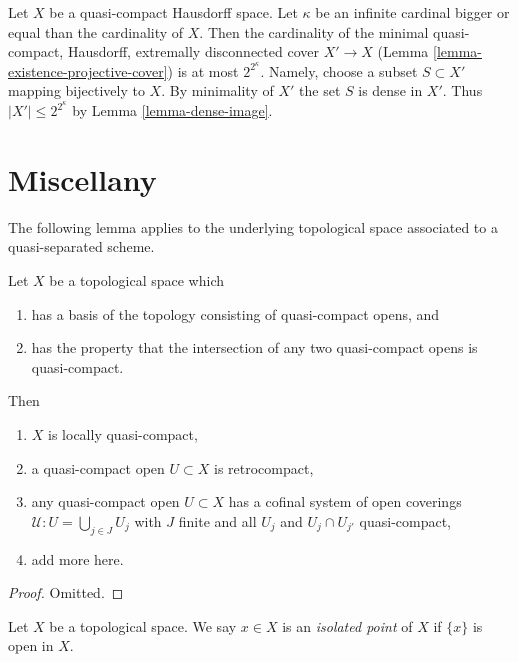 \begin{remark}
\label{remark-size-projective-cover}
Let $X$ be a quasi-compact Hausdorff space. Let $\kappa$ be an infinite
cardinal bigger or equal than the cardinality of $X$. Then the cardinality
of the minimal quasi-compact, Hausdorff, extremally disconnected cover
$X' \to X$ (Lemma \ref{lemma-existence-projective-cover})
is at most $2^{2^\kappa}$. Namely, choose a subset $S \subset X'$
mapping bijectively to $X$. By minimality of $X'$ the set $S$ is dense
in $X'$. Thus $|X'| \leq 2^{2^\kappa}$ by Lemma \ref{lemma-dense-image}.
\end{remark}






\section{Miscellany}
\label{section-miscellany}


\noindent
The following lemma applies to the underlying topological space
associated to a quasi-separated scheme.

\begin{lemma}
\label{lemma-topology-quasi-separated-scheme}
Let $X$ be a topological space which
\begin{enumerate}
\item has a basis of the topology consisting of quasi-compact opens, and
\item has the property that the intersection of any two quasi-compact
opens is quasi-compact.
\end{enumerate}
Then
\begin{enumerate}
\item $X$ is locally quasi-compact,
\item a quasi-compact open $U \subset X$ is retrocompact,
\item any quasi-compact open $U \subset X$ has a cofinal system of open
coverings $\mathcal{U} : U = \bigcup_{j\in J} U_j$ with $J$ finite
and all $U_j$ and $U_j \cap U_{j'}$ quasi-compact,
\item add more here.
\end{enumerate}
\end{lemma}

\begin{proof}
Omitted.
\end{proof}

\begin{definition}
\label{definition-isolated-point}
Let $X$ be a topological space. We say $x \in X$ is an
{\it isolated point} of $X$ if $\{x\}$ is open in $X$.
\end{definition}
























